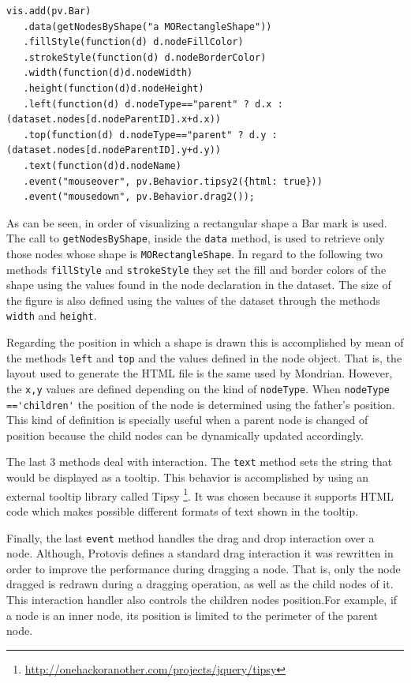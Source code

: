 \documentclass[preprint,10pt]{sigplanconf}
\newcommand{\ct}{\lstinline[backgroundcolor=\color{white},basicstyle=\footnotesize\ttfamily]}
\begin{document}
\begin{lstlisting} 
vis.add(pv.Bar)
   .data(getNodesByShape("a MORectangleShape"))
   .fillStyle(function(d) d.nodeFillColor)
   .strokeStyle(function(d) d.nodeBorderColor)
   .width(function(d)d.nodeWidth)
   .height(function(d)d.nodeHeight)
   .left(function(d) d.nodeType=="parent" ? d.x : (dataset.nodes[d.nodeParentID].x+d.x))
   .top(function(d) d.nodeType=="parent" ? d.y : (dataset.nodes[d.nodeParentID].y+d.y))
   .text(function(d)d.nodeName)
   .event("mouseover", pv.Behavior.tipsy2({html: true}))
   .event("mousedown", pv.Behavior.drag2());
\end{lstlisting}

As can be seen, in order of visualizing a rectangular shape a Bar mark is used. The call to \ct{getNodesByShape}, inside the \ct{data} method, is used to retrieve only those nodes whose shape is \ct{MORectangleShape}. In regard to the following two methods \ct{fillStyle} and \ct{strokeStyle} they set the fill and border colors of the shape using the values found in the node declaration in the dataset. The size of the figure is also defined using the values of the dataset through the methods \ct{width} and \ct{height}.

Regarding the position in which a shape is drawn this is accomplished by mean of the methods \ct{left} and \ct{top} and the values defined in the node object. That is, the layout used to generate the HTML file is the same used by Mondrian. However, the \ct{x,y} values are defined depending on the kind of \ct{nodeType}. When \ct{nodeType =='children'} the position of the node is determined using the father's position. This kind of definition is specially useful when a parent node is changed of position because the child nodes can be dynamically updated accordingly.  

The last 3 methods deal with interaction. The \ct{text} method sets the string that would be displayed as a tooltip. This behavior is accomplished by using an external tooltip library called Tipsy \footnote{\url{http://onehackoranother.com/projects/jquery/tipsy}}. It was chosen because it supports HTML code which makes possible different formats of text shown in the tooltip. 

Finally, the last \ct{event} method handles the drag and drop interaction over a node. Although, Protovis defines a standard drag interaction it was rewritten in order to improve the performance during dragging a node. That is,  only the node dragged is redrawn during a dragging operation, as well as the child nodes of it. This interaction handler also controls the children nodes position.For example, if a node is an inner node, its position is limited to the perimeter of the parent node.
\end{document}
